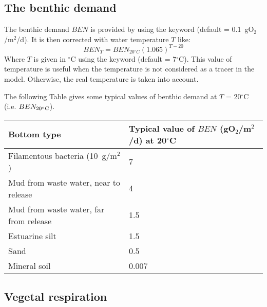 \subsection{The benthic demand}

The benthic demand $BEN$ is provided by 
using the keyword  (default = 0.1~gO$_2$/m$^2$/d).
It is then corrected with water temperature $T$ like:
\[{BEN}_T={BEN}_{20^\circ C}{\left(1.065\right)}^{T-20}\]
Where $T$ is given in $^{\circ}$C using the keyword 
(default = 7$^\circ$C).
This value of temperature is useful when the temperature is not considered
as a tracer in the model.
Otherwise, the real temperature is taken into account.

The following Table gives some typical values of benthic demand
at $T$ = 20$^\circ$C (i.e. $BEN_{20^\circ \rm{C}}$).\\

\begin{table}[H]
 			\centering
\begin{tabular}{p{3.0in}p{3.0in}}
\hline
\multicolumn{1}{|p{3.0in}}{Bottom type} & 
\multicolumn{1}{|p{3.0in}|}{Typical value of $BEN$ (gO$_2$/m$^2$/d) at 20$^{\circ}$C} \\
\hline
\multicolumn{1}{|p{3.0in}}{Filamentous bacteria (10~g/m$^2$)} & 
\multicolumn{1}{|p{3.0in}|}{7} \\
\hline
\multicolumn{1}{|p{3.0in}}{Mud from waste water, near to release} & 
\multicolumn{1}{|p{3.0in}|}{4} \\
\hline
\multicolumn{1}{|p{3.0in}}{Mud from waste water, far from release } & 
\multicolumn{1}{|p{3.0in}|}{1.5} \\
\hline
\multicolumn{1}{|p{3.0in}}{Estuarine silt} & 
\multicolumn{1}{|p{3.0in}|}{1.5} \\
\hline
\multicolumn{1}{|p{3.0in}}{Sand} & 
\multicolumn{1}{|p{3.0in}|}{0.5} \\
\hline
\multicolumn{1}{|p{3.0in}}{Mineral soil} & 
\multicolumn{1}{|p{3.0in}|}{0.007} \\
\hline

\end{tabular}
\end{table}


\subsection{Vegetal respiration}

